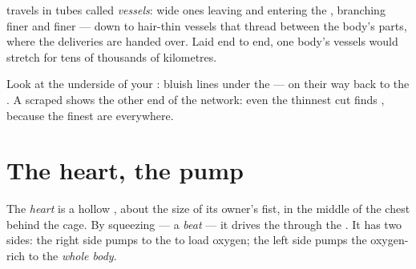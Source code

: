 \begin{definition}\label{def:g4:heart-and-blood:vessels}
 travels in tubes called 
\emph{vessels}: wide ones leaving and
entering the , branching finer and finer --- down to
hair-thin vessels that thread between the body's parts, where
the deliveries are handed over. Laid end to end, one body's
vessels would stretch for tens of thousands of kilometres.
\end{definition}

\begin{remark}\label{rem:g4:heart-and-blood:see}
Look at the underside of your : bluish lines under the
 ---  on their way back to the . A
scraped  shows the other end of the network: even the
thinnest cut finds , because the finest  are
everywhere.
\end{remark}

\section{The heart, the pump}

\begin{definition}\label{def:g4:heart-and-blood:heart}
The \emph{heart} is a hollow , about the
size of its owner's fist, in the middle of the chest behind
the  cage. By squeezing --- a \emph{beat}
--- it drives the  through the . It has two sides:
the right side pumps  to the \emph{} to load oxygen;
the left side pumps the oxygen-rich  to the \emph{whole
body}.
\end{definition}

